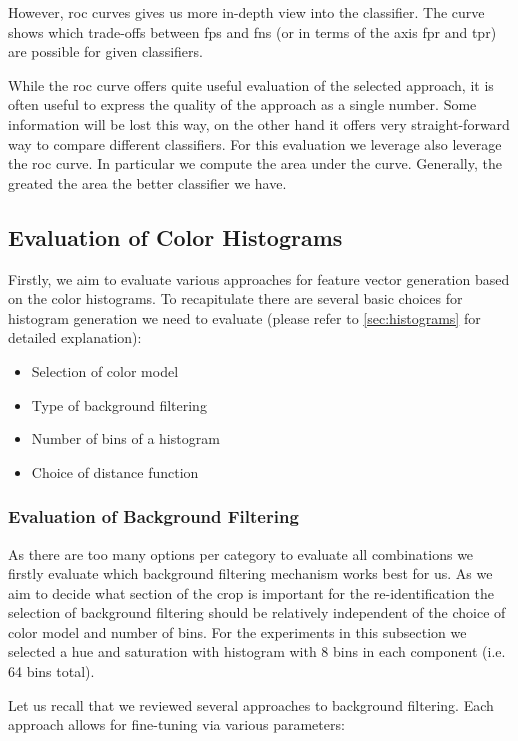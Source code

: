 However, \gls{roc} curves gives us more in-depth view into the classifier.
The curve shows which trade-offs between \glspl{fp} and \glspl{fn} (or in terms
of the axis \gls{fpr} and \gls{tpr}) are possible for given classifiers.

While the \gls{roc} curve offers quite useful evaluation of the
selected approach, it is often useful to express the quality of the
approach as a single number. Some information will be lost this way,
on the other hand it offers very straight-forward way to compare different
classifiers. For this evaluation we leverage also leverage the \gls{roc} curve.
In particular we compute the area under the curve. Generally, the greated
the area the better classifier we have.

\subsection{Evaluation of Color Histograms}

Firstly, we aim to evaluate various approaches for feature vector generation
based on the color histograms. To recapitulate there are several basic choices
for histogram generation we need to evaluate (please refer to
\autoref{sec:histograms} for detailed explanation):

\begin{itemize}
    \item Selection of color model
    \item Type of background filtering
    \item Number of bins of a histogram
    \item Choice of distance function
\end{itemize}

\subsubsection{Evaluation of Background Filtering}

As there are too many options per category to evaluate all combinations we
firstly evaluate which background filtering mechanism works best for us. As we
aim to decide what section of the crop is important for the re-identification
the selection of background filtering should be relatively independent of
the choice of color model and number of bins. For the experiments in this
subsection we selected a hue and saturation with histogram with 8 bins in
each component (i.e. 64 bins total).

Let us recall that we reviewed several approaches to background filtering.
Each approach allows for fine-tuning via various parameters:

